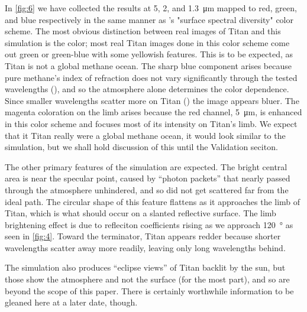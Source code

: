 \documentclass{article}
\begin{document}
In \ref{fig:6} we have collected the results at 5, 2, and \qty{1.3}{\micro\meter} mapped to red, green, and blue respectively in the same manner as \cite{Barnes2018}'s "surface spectral diversity" color scheme. The most obvious distinction between real images of Titan and this simulation is the color; most real Titan images done in this color scheme come out green or green-blue with some yellowish features. This is to be expected, as Titan is not a global methane ocean. The sharp blue component arises because pure methane's index of refraction does not vary significantly through the tested wavelengths (\cite{Martonchik1994}), and so the atmosphere alone determines the color dependence. Since smaller wavelengths scatter more on Titan (\cite{EsSayeh2023}) the image appears bluer. The magenta coloration on the limb arises because the red channel, \qty{5}{\micro\meter}, is enhanced in this color scheme and focuses most of its intensity on Titan's limb. We expect that it Titan really were a global methane ocean, it would look similar to the simulation, but we shall hold discussion of this until the Validation seciton.

The other primary features of the simulation are expected. The bright central area is near the specular point, caused by ``photon packets'' that nearly passed through the atmosphere unhindered, and so did not get scattered far from the ideal path. The circular shape of this feature flattens as it approaches the limb of Titan, which is what should occur on a slanted reflective surface. The limb brightening effect is due to refleciton coefficients rising as we approach \qty{120}{\degree} as seen in \ref{fig:4}. Toward the terminator, Titan appears redder because shorter wavelengths scatter away more readily, leaving only long wavelengths behind.

The simulation also produces ``eclipse views'' of Titan backlit by the sun, but those show the atmosphere and not the surface (for the most part), and so are beyond the scope of this paper. There is certainly worthwhile information to be gleaned here at a later date, though. 
\end{document}
